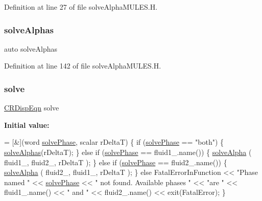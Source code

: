 Definition at line 27 of file solve\+Alpha\+M\+U\+L\+E\+S.\+H.

\mbox{\label{solveAlphaMULES_8H_ac418babfa8e0a42a6b77aa6730f97efb}} 
\subsubsection{\texorpdfstring{solve\+Alphas}{solveAlphas}}
{\footnotesize\ttfamily auto solve\+Alphas}



Definition at line 142 of file solve\+Alpha\+M\+U\+L\+E\+S.\+H.

\mbox{\label{solveAlphaMULES_8H_a2de99cc2184e44282013f20748f72470}} 
\subsubsection{\texorpdfstring{solve}{solve}}
{\footnotesize\ttfamily \hyperlink{solveThermalMechanics_8H_ab3fed776777f504294b4e82fcf9429a2}{C\+R\+Disp\+Eqn} solve}

{\bfseries Initial value\+:}
\begin{DoxyCode}
= [&](word \hyperlink{solveAlphaMULES_8H_a6b6b670db65a241e294cd39d06b05192}{solvePhase}, scalar rDeltaT)
\{
    \textcolor{keywordflow}{if} (\hyperlink{solveAlphaMULES_8H_a6b6b670db65a241e294cd39d06b05192}{solvePhase} == \textcolor{stringliteral}{"both"})
    \{
        \hyperlink{solveAlphaMULES_8H_ac418babfa8e0a42a6b77aa6730f97efb}{solveAlphas}(rDeltaT);
    \}
    \textcolor{keywordflow}{else} \textcolor{keywordflow}{if} (\hyperlink{solveAlphaMULES_8H_a6b6b670db65a241e294cd39d06b05192}{solvePhase} == fluid1\_.name())
    \{
        \hyperlink{solveAlphaMULES_8H_ad9bc77589ca7ad7822f7ec27d377a8ce}{solveAlpha}
        (
            fluid1\_,
            fluid2\_,
            rDeltaT
        );
    \}
    \textcolor{keywordflow}{else} \textcolor{keywordflow}{if} (\hyperlink{solveAlphaMULES_8H_a6b6b670db65a241e294cd39d06b05192}{solvePhase} == fluid2\_.name())
    \{
        \hyperlink{solveAlphaMULES_8H_ad9bc77589ca7ad7822f7ec27d377a8ce}{solveAlpha}
        (
            fluid2\_,
            fluid1\_,
            rDeltaT
        );
    \}
    \textcolor{keywordflow}{else}
        FatalErrorInFunction 
        << \textcolor{stringliteral}{"Phase named "} << \hyperlink{solveAlphaMULES_8H_a6b6b670db65a241e294cd39d06b05192}{solvePhase} << \textcolor{stringliteral}{" not found. Available phases "} 
        << \textcolor{stringliteral}{"are "} << fluid1\_.name() << \textcolor{stringliteral}{" and "} << fluid2\_.name()
        << exit(FatalError);
\}
\end{DoxyCode}


